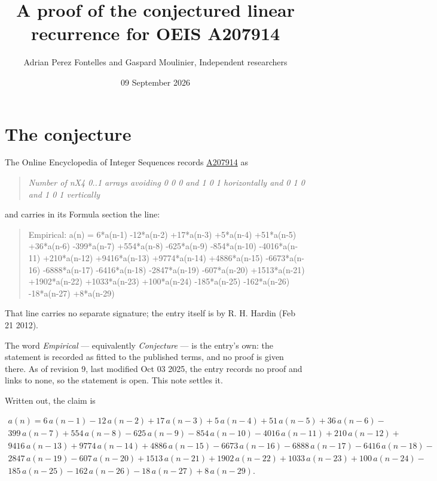 \documentclass[11pt]{article}
\title{A proof of the conjectured linear recurrence for OEIS A207914}
\author{Adrian Perez Fontelles and Gaspard Moulinier, Independent researchers}
\date{09 September 2026}
\theoremstyle{definition}
\begin{document}
\maketitle
\section{The conjecture}

The Online Encyclopedia of Integer Sequences records \href{https://oeis.org/A207914}{A207914} as

\begin{quote}\itshape Number of nX4 0..1 arrays avoiding 0 0 0 and 1 0 1 horizontally and 0 1 0 and 1 0 1 vertically\end{quote}

and carries in its Formula section the line:

\begin{quote}\ttfamily Empirical: a(n) = 6*a(n-1) -12*a(n-2) +17*a(n-3) +5*a(n-4) +51*a(n-5) +36*a(n-6) -399*a(n-7) +554*a(n-8) -625*a(n-9) -854*a(n-10) -4016*a(n-11) +210*a(n-12) +9416*a(n-13) +9774*a(n-14) +4886*a(n-15) -6673*a(n-16) -6888*a(n-17) -6416*a(n-18) -2847*a(n-19) -607*a(n-20) +1513*a(n-21) +1902*a(n-22) +1033*a(n-23) +100*a(n-24) -185*a(n-25) -162*a(n-26) -18*a(n-27) +8*a(n-29)\end{quote}

That line carries no separate signature; the entry itself is by R. H. Hardin (Feb 21 2012).

The word {\itshape Empirical} --- equivalently {\itshape Conjecture} --- is the entry's own: the statement is recorded as fitted to the published terms, and no proof is given there. As of revision 9, last modified Oct 03 2025, the entry records no proof and links to none, so the statement is open. This note settles it.

Written out, the claim is

\begin{multline*} a(n) = 6\,a(n-1) - 12\,a(n-2) + 17\,a(n-3) + 5\,a(n-4) + 51\,a(n-5) + 36\,a(n-6) - \\ 399\,a(n-7) + 554\,a(n-8) - 625\,a(n-9) - 854\,a(n-10) - 4016\,a(n-11) + 210\,a(n-12) + \\ 9416\,a(n-13) + 9774\,a(n-14) + 4886\,a(n-15) - 6673\,a(n-16) - 6888\,a(n-17) - 6416\,a(n-18) - \\ 2847\,a(n-19) - 607\,a(n-20) + 1513\,a(n-21) + 1902\,a(n-22) + 1033\,a(n-23) + 100\,a(n-24) - \\ 185\,a(n-25) - 162\,a(n-26) - 18\,a(n-27) + 8\,a(n-29). \end{multline*}
\end{document}
